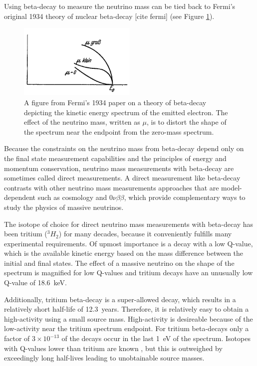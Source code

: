 Using beta-decay to measure the neutrino mass can be tied back to Fermi's original 1934 theory of nuclear beta-decay [cite fermi] (see Figure \ref{fig:chap2-fermi-original-b-spectrum}).
\begin{figure}[htbp]
    \centering
    \includegraphics[width=0.5\textwidth]{figs/Chapter-2/Fermi.png}
    \caption{A figure from Fermi's 1934 paper on a theory of beta-decay depicting the kinetic energy spectrum of the emitted electron. The effect of the neutrino mass, written as $\mu$, is to distort the shape of the spectrum near the endpoint from the zero-mass spectrum.}
    \label{fig:chap2-fermi-original-b-spectrum}
\end{figure}
Because the constraints on the neutrino mass from beta-decay depend only on the final state measurement capabilities and the principles of energy and momentum conservation, neutrino mass measurements with beta-decay are sometimes called direct measurements. A direct measurement like beta-decay contrasts with other neutrino mass measurements approaches that are model-dependent such as cosmology and $0\nu\beta\beta$, which provide complementary ways to study the physics of massive neutrinos.

The isotope of choice for direct neutrino mass measurements with beta-decay has been tritium ($^3H_2$) for many decades, because it conveniently fulfills many experimental requirements. Of upmost importance is a decay with a low Q-value, which is the available kinetic energy based on the mass difference between the initial and final states. The effect of a massive neutrino on the shape of the spectrum is magnified for low Q-values and tritium decays have an unusually low Q-value of 18.6~keV.

Additionally, tritium beta-decay is a super-allowed decay, which results in a relatively short half-life of 12.3~years. Therefore, it is relatively easy to obtain a high-activity using a small source mass. High-activity is desireable because of the low-activity near the tritium spectrum endpoint. For tritium beta-decays only a factor of $3\times10^{-13}$ of the decays occur in the last 1~eV of the spectrum. Isotopes with Q-values lower than tritium are known \cite{FORMAGGIO20211}, but this is outweighed by exceedingly long half-lives leading to unobtainable source masses.

